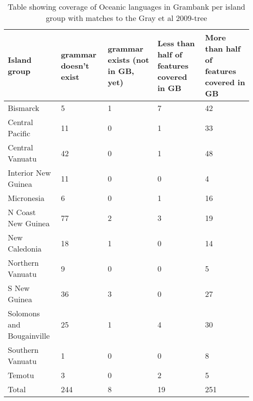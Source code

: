 \begin{table}[ht]
\centering
\begin{tabular}{p{5cm}p{2.7cm}p{2.7cm}p{2.7cm}p{2.7cm}}
  \hline
Island group & grammar doesn't exist & grammar exists (not in GB, yet) & Less than half of features covered in GB & More than half of features covered in GB \\ 
  \hline
Bismarck & 5 & 1 & 7 & 42 \\ 
  Central Pacific & 11 & 0 & 1 & 33 \\ 
  Central Vanuatu & 42 & 0 & 1 & 48 \\ 
  Interior New Guinea & 11 & 0 & 0 & 4 \\ 
  Micronesia & 6 & 0 & 1 & 16 \\ 
  N Coast New Guinea & 77 & 2 & 3 & 19 \\ 
  New Caledonia & 18 & 1 & 0 & 14 \\ 
  Northern Vanuatu & 9 & 0 & 0 & 5 \\ 
  S New Guinea & 36 & 3 & 0 & 27 \\ 
  Solomons and Bougainville & 25 & 1 & 4 & 30 \\ 
  Southern Vanuatu & 1 & 0 & 0 & 8 \\ 
  Temotu & 3 & 0 & 2 & 5 \\ 
  Total & 244 & 8 & 19 & 251 \\ 
   \hline
\end{tabular}
\caption{Table showing coverage of Oceanic languages in Grambank per island group with matches to the Gray et al 2009-tree} 
\label{GB_coverage_table_island_group_gray}
\end{table}

